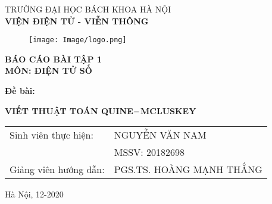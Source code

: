 \documentclass[titlepage]{article} %
\begin{document}
\begin{titlepage}

\begin{center}\vspace{-10pt}
\textnormal{\fontsize{14pt}{0pt}\selectfont TRƯỜNG ĐẠI HỌC BÁCH KHOA HÀ NỘI \\}
\textbf{\fontsize{16pt}{0pt}\selectfont VIỆN ĐIỆN TỬ - VIỄN THÔNG}
\vspace{1.0cm}
\begin{figure}[H]
	\centering
	\texttt{[image: Image/logo.png]}
\end{figure}
\vspace{2cm}
\textbf{\fontsize{20pt}{6pt}\selectfont BÁO CÁO BÀI TẬP 1} \\
    \textbf{\fontsize{20pt}{6pt}\selectfont MÔN: ĐIỆN TỬ SỐ}
    \end{center} \vspace{0.3cm}
    
\hspace{10pt} \textbf{\fontsize{16pt}{6pt}\selectfont Đề bài: } \vspace{-1em}
\begin{center} 
\textbf{\fontsize{20pt}{6pt}\selectfont VIẾT  THUẬT TOÁN QUINE$\--$MCLUSKEY}
\end{center}
\vspace{2.0cm}
\begin{center}
\begin{tabular}{ l l }
\fontsize{14pt}{0pt}\selectfont Sinh viên thực hiện: & \fontsize{14pt}{0pt}\selectfont NGUYỄN VĂN NAM   \\ 
  & \fontsize{14pt}{0pt}\selectfont MSSV: 20182698 \\   
\fontsize{14pt}{0pt}\selectfont Giảng viên hướng dẫn: &  \fontsize{14pt}{0pt}\selectfont  PGS.TS. HOÀNG MẠNH THẮNG
\end{tabular}
\end{center}
\vspace{3.5cm}
\fontsize{14pt}{0pt}\selectfont \centering Hà Nội, 12-2020
\end{titlepage}
\cleardoublepage
\end{document}
